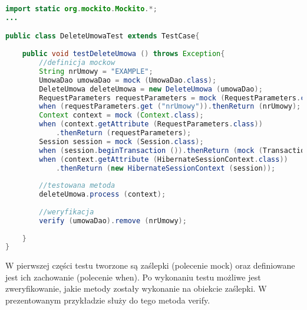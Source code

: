 \begin{lstlisting}[language=Java,style=outcode,showstringspaces=false,caption=Test akcji usuwającej umowę wykorzystujący zaślepki,label={mockito}]
import static org.mockito.Mockito.*;
...

public class DeleteUmowaTest extends TestCase{
	
	public void testDeleteUmowa () throws Exception{
		//definicja mockow
		String nrUmowy = "EXAMPLE";
		UmowaDao umowaDao = mock (UmowaDao.class);
		DeleteUmowa deleteUmowa = new DeleteUmowa (umowaDao);
		RequestParameters requestParameters = mock (RequestParameters.class);
		when (requestParameters.get ("nrUmowy")).thenReturn (nrUmowy);
		Context context = mock (Context.class);
		when (context.getAttribute (RequestParameters.class))
			.thenReturn (requestParameters);
		Session session = mock (Session.class);
		when (session.beginTransaction ()).thenReturn (mock (Transaction.class));
		when (context.getAttribute (HibernateSessionContext.class))
			.thenReturn (new HibernateSessionContext (session));
		
		//testowana metoda
		deleteUmowa.process (context);
		
		//weryfikacja
		verify (umowaDao).remove (nrUmowy);
		
	}
}
\end{lstlisting}

W pierwszej części testu tworzone są zaślepki (polecenie mock) oraz definiowane jest ich zachowanie (polecenie when). Po wykonaniu testu możliwe jest zweryfikowanie, jakie metody zostały wykonanie na obiekcie zaślepki. W prezentowanym przykładzie służy do tego metoda verify.
